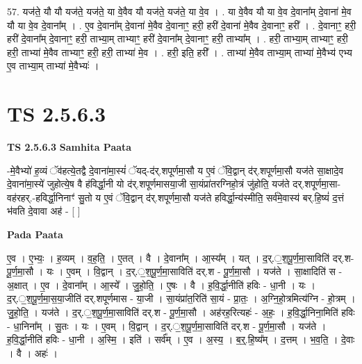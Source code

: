 \documentclass[17pt]{extarticle}
\begin{document}
57. यज॑ते॒ यौ यौ यज॑ते॒ यज॑ते॒ या वे॒वैव यौ यज॑ते॒ यज॑ते॒ या वे॒व । . या वे॒वैव यौ या वे॒व दे॒वाना᳚म् दे॒वाना॑ मे॒व यौ या वे॒व दे॒वाना᳚म् । . ए॒व दे॒वाना᳚म् दे॒वाना॑ मे॒वैव दे॒वानाꣳ॒॒ हरी॒ हरी॑ दे॒वाना॑ मे॒वैव दे॒वानाꣳ॒॒ हरी᳚ । . दे॒वानाꣳ॒॒ हरी॒ हरी॑ दे॒वाना᳚म् दे॒वानाꣳ॒॒ हरी॒ ताभ्या॒म् ताभ्याꣳ॒॒ हरी॑ दे॒वाना᳚म् दे॒वानाꣳ॒॒ हरी॒ ताभ्या᳚म् । . हरी॒ ताभ्या॒म् ताभ्याꣳ॒॒ हरी॒ हरी॒ ताभ्या॑ मे॒वैव ताभ्याꣳ॒॒ हरी॒ हरी॒ ताभ्या॑ मे॒व । . हरी॒ इति॒ हरी᳚ । . ताभ्या॑ मे॒वैव ताभ्या॒म् ताभ्या॑ मे॒वैभ्य॑ एभ्य ए॒व ताभ्या॒म् ताभ्या॑ मे॒वैभ्यः॑ । \newline
\pagebreak
{}

\section{ TS 2.5.6.3 }

\textbf{TS 2.5.6.3 } \newline
\textbf{Samhita Paata} \newline

-मे॒वैभ्यो॑ ह॒व्यं ॅव॑हत्ये॒तद्वै दे॒वाना॑मा॒स्यं॑ ॅयद्-द॑र्.शपूर्णमा॒सौ य ए॒वं ॅवि॒द्वान् द॑र्.शपूर्णमा॒सौ यज॑ते सा॒क्षादे॒व दे॒वाना॑मा॒स्ये॑ जुहोत्ये॒ष वै ह॑विर्द्धा॒नी यो द॑र्.शपूर्णमासया॒जी सा॒यंप्रा॑तरग्निहो॒त्रं जु॑होति॒ यज॑ते दर्.शपूर्णमा॒सा-वह॑रहर्.-हविर्द्धा॒निनाꣳ॑ सु॒तो य ए॒वं ॅवि॒द्वान् द॑र्.शपूर्णमा॒सौ यज॑ते हविर्द्धा॒न्य॑स्मीति॒ सर्व॑मे॒वास्य॑ बर्.हि॒ष्यं॑ द॒त्तं भ॑वति दे॒वावा अह॑ - [  ] \newline

\textbf{Pada Paata} \newline

ए॒व । ए॒भ्यः॒ । ह॒व्यम् । व॒ह॒ति॒ । ए॒तत् । वै । दे॒वाना᳚म् । आ॒स्य᳚म् । यत् । द॒र्.॒श॒पू॒र्ण॒मा॒साविति॑ दर्.श-पू॒र्ण॒मा॒सौ । यः । ए॒वम् । वि॒द्वान् । द॒र्.॒श॒पू॒र्ण॒मा॒साविति॑ दर्.श - पू॒र्ण॒मा॒सौ । यज॑ते । सा॒क्षादिति॑ स - अ॒क्षात् । ए॒व । दे॒वाना᳚म् । आ॒स्ये᳚ । जु॒हो॒ति॒ । ए॒षः । वै । ह॒वि॒र्द्धा॒नीति॑ हविः - धा॒नी । यः । द॒र्.॒श॒पू॒र्ण॒मा॒स॒या॒जीति॑ दर्.शपूर्णमास - या॒जी । सा॒यंप्रा॑त॒रिति॑ सा॒यं - प्रा॒तः॒ । अ॒ग्नि॒हो॒त्रमित्य॑ग्नि - हो॒त्रम् । जु॒हो॒ति॒ । यज॑ते । द॒र्.॒श॒पू॒र्ण॒मा॒साविति॑ दर्.श - पू॒र्ण॒मा॒सौ । अह॑रह॒रित्यहः॑ - अ॒हः॒ । ह॒वि॒र्द्धा॒निना॒मिति॑ हविः - धा॒निना᳚म् । सु॒तः । यः । ए॒वम् । वि॒द्वान् । द॒र्.॒श॒पू॒र्ण॒मा॒साविति॑ दर्.श - पू॒र्ण॒मा॒सौ । यज॑ते । ह॒वि॒र्द्धा॒नीति॑ हविः - धा॒नी । अ॒स्मि॒ । इति॑ । सर्व᳚म् । ए॒व । अ॒स्य॒ । ब॒र्॒.हि॒ष्य᳚म् । द॒त्तम् । भ॒व॒ति॒ । दे॒वाः । वै । अहः॑ ।  \newline
\end{document}
